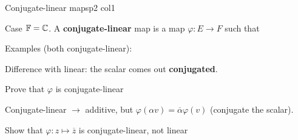 \documentclass[course,noautoquant,noautokw]{neyvia-study}
\begin{document}
\begin{concept}[1.32]{Conjugate-linear maps}{p2 col1}
\begin{definition}
\noindent Case $\mathbb{F}=\mathbb{C}$. A \textbf{conjugate-linear} map is a map $\varphi:E\to F$ such that
\par\noindent Examples (both conjugate-linear):
\par\noindent Difference with linear: the scalar comes out \textbf{conjugated}.
\end{definition}
\begin{method}{Prove that $\varphi$ is conjugate-linear}
\end{method}
\begin{reflex}
Conjugate-linear \ensuremath{\rightarrow} additive, but $\varphi(\alpha v)=\overline{\alpha}\varphi(v)$ (conjugate the scalar).
\end{reflex}
\begin{worked}{Show that $\varphi:z\mapsto\overline{z}$ is conjugate-linear, not linear}
\end{worked}
\begin{traps}
\end{traps}
\end{concept}
\end{document}
